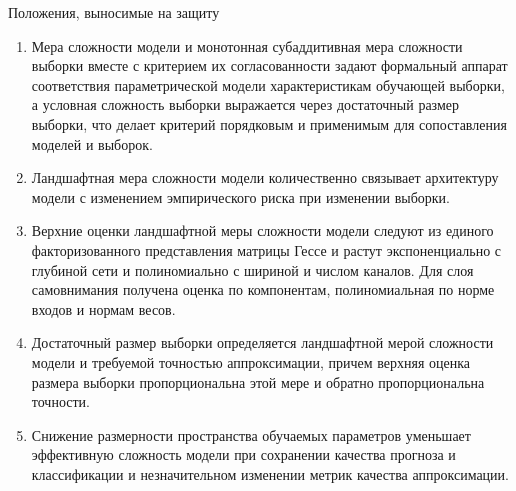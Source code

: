 \documentclass[9pt,pdf,hyperref={unicode}]{beamer}
\begin{document}
\begin{frame}{Положения, выносимые на защиту}
\justifying
\normalsize
\begin{enumerate}
    \justifying
    \setlength{\itemsep}{-1pt}
    \item Мера сложности модели и монотонная субаддитивная мера сложности выборки вместе с критерием их согласованности задают формальный аппарат соответствия параметрической модели характеристикам обучающей выборки, а условная сложность выборки выражается через достаточный размер выборки, что делает критерий порядковым и применимым для сопоставления моделей и выборок.
    \item Ландшафтная мера сложности модели количественно связывает архитектуру модели с изменением эмпирического риска при изменении выборки.
    \item Верхние оценки ландшафтной меры сложности модели следуют из единого факторизованного представления матрицы Гессе и растут экспоненциально с глубиной сети и полиномиально с шириной и числом каналов. Для слоя самовнимания получена оценка по компонентам, полиномиальная по норме входов и нормам весов.
    \item Достаточный размер выборки определяется ландшафтной мерой сложности модели и требуемой точностью аппроксимации, причем верхняя оценка размера выборки пропорциональна этой мере и обратно пропорциональна точности.
    \item Снижение размерности пространства обучаемых параметров уменьшает эффективную сложность модели при сохранении качества прогноза и классификации и незначительном изменении метрик качества аппроксимации.
\end{enumerate}
\end{frame}
\end{document}
